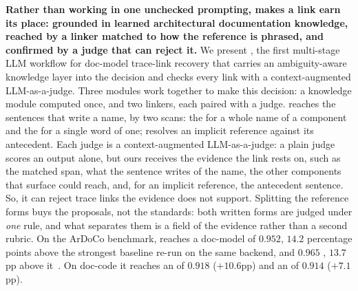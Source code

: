 \textbf{Rather than working in one unchecked prompting, \approach makes a link earn its place: grounded in learned architectural documentation knowledge, reached by a linker matched to how the reference is phrased, and confirmed by a judge that can reject it.}
We present \approach, the first multi-stage \ac{LLM} workflow for doc-model trace-link recovery that carries an ambiguity-aware knowledge layer into the decision and checks every link with a context-augmented \ac{LLM}-as-a-judge.
Three modules work together to make this decision: a knowledge module computed once, and two linkers, each paired with a judge.
\linkerN reaches the sentences that write a name, by two scans: the \linkerB for a whole name of a component and the \linkerD for a single word of one; \linkerC resolves an implicit reference against its antecedent.
Each judge is a context-augmented \ac{LLM}-as-a-judge: a plain judge scores an output alone, but ours receives the evidence the link rests on, such as the matched span, what the sentence writes of the name, the other components that surface could reach, and, for an implicit reference, the antecedent sentence.
So, it can reject trace links the evidence does not support.
Splitting the reference forms buys the proposals, not the standards: both written forms are judged under \emph{one} rule, and what separates them is a field of the evidence rather than a second rubric.
On the ArDoCo benchmark\cite{fuchs_establishing_2023}, \approach reaches a doc-model \avgfone of $0.952$, $14.2$ percentage points above the strongest baseline \Artemis{} re-run on the same backend, and $0.965$ \avgftwo, $13.7$pp above it~\cite{fuchs_whos_2025,keim_recovering_2024,replication}.
On doc-code it reaches an \avgfone of $0.918$ ($+10.6$pp) and an \avgftwo of $0.914$ ($+7.1$pp). 

